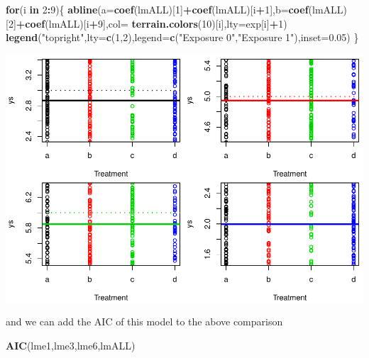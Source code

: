 \documentclass[
]{book}
\newenvironment{Shaded}{\begin{snugshade}}{\end{snugshade}}
\newcommand{\AttributeTok}[1]{\textcolor[rgb]{0.13,0.29,0.53}{#1}}
\newcommand{\ControlFlowTok}[1]{\textcolor[rgb]{0.13,0.29,0.53}{\textbf{#1}}}
\newcommand{\DecValTok}[1]{\textcolor[rgb]{0.00,0.00,0.81}{#1}}
\newcommand{\FloatTok}[1]{\textcolor[rgb]{0.00,0.00,0.81}{#1}}
\newcommand{\FunctionTok}[1]{\textcolor[rgb]{0.13,0.29,0.53}{\textbf{#1}}}
\newcommand{\NormalTok}[1]{#1}
\newcommand{\SpecialCharTok}[1]{\textcolor[rgb]{0.81,0.36,0.00}{\textbf{#1}}}
\newcommand{\StringTok}[1]{\textcolor[rgb]{0.31,0.60,0.02}{#1}}
\begin{document}
\begin{Shaded}
\begin{Highlighting}[]
\ControlFlowTok{for}\NormalTok{(i }\ControlFlowTok{in} \DecValTok{2}\SpecialCharTok{:}\DecValTok{9}\NormalTok{)\{}
  \FunctionTok{abline}\NormalTok{(}\AttributeTok{a=}\FunctionTok{coef}\NormalTok{(lmALL)[}\DecValTok{1}\NormalTok{]}\SpecialCharTok{+}\FunctionTok{coef}\NormalTok{(lmALL)[i}\SpecialCharTok{+}\DecValTok{1}\NormalTok{],}\AttributeTok{b=}\FunctionTok{coef}\NormalTok{(lmALL)[}\DecValTok{2}\NormalTok{]}\SpecialCharTok{+}\FunctionTok{coef}\NormalTok{(lmALL)[i}\SpecialCharTok{+}\DecValTok{9}\NormalTok{],}\AttributeTok{col=} \FunctionTok{terrain.colors}\NormalTok{(}\DecValTok{10}\NormalTok{)[i],}\AttributeTok{lty=}\NormalTok{exp[i]}\SpecialCharTok{+}\DecValTok{1}\NormalTok{)}
  \FunctionTok{legend}\NormalTok{(}\StringTok{"topright"}\NormalTok{,}\AttributeTok{lty=}\FunctionTok{c}\NormalTok{(}\DecValTok{1}\NormalTok{,}\DecValTok{2}\NormalTok{),}\AttributeTok{legend=}\FunctionTok{c}\NormalTok{(}\StringTok{"Exposure 0"}\NormalTok{,}\StringTok{"Exposure 1"}\NormalTok{),}\AttributeTok{inset=}\FloatTok{0.05}\NormalTok{)}
\NormalTok{\}}
\end{Highlighting}
\end{Shaded}

\includegraphics{ECOMODbook_files/figure-latex/unnamed-chunk-82-1.pdf}

and we can add the AIC of this model to the above comparison

\begin{Shaded}
\begin{Highlighting}[]
\FunctionTok{AIC}\NormalTok{(lme1,lme3,lme6,lmALL)}
\end{Highlighting}
\end{Shaded}
\end{document}
